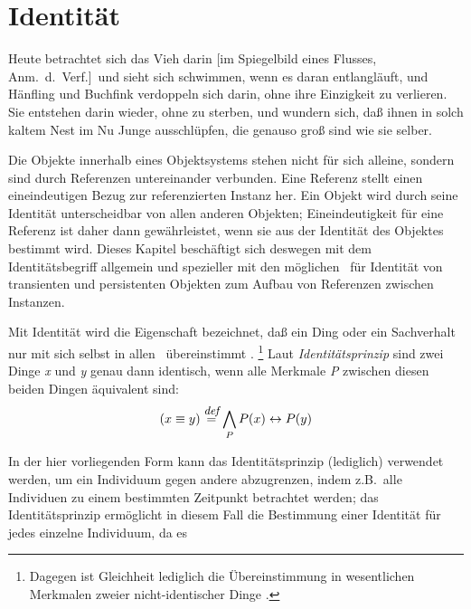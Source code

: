 %
\chapter{Identit\"{a}t}%
\label{chap:idty}%
%
\begin{fortune}
Heute betrachtet sich das Vieh darin [im Spiegelbild eines Flusses,
Anm.\ d.\ Verf.]\ und sieht sich schwimmen, wenn es daran
entlangl\"{a}uft, und H\"{a}nfling und Buchfink verdoppeln sich darin, ohne
ihre Einzigkeit zu verlieren. Sie entstehen darin wieder, ohne zu
sterben, und wundern sich, da\ss{} ihnen in solch kaltem Nest im Nu Junge
ausschl\"{u}pfen, die genauso gro\ss{} sind wie sie selber.
\end{fortune}
%
Die Objekte innerhalb eines Objektsystems stehen nicht f\"{u}r sich
alleine, sondern sind durch Referenzen untereinander verbunden. Eine 
Referenz stellt einen eineindeutigen Bezug zur referenzierten Instanz
her. Ein Objekt wird durch seine Identit\"{a}t unterscheidbar von allen
anderen Objekten; Eineindeutigkeit f\"{u}r eine Referenz ist daher dann
gew\"{a}hrleistet, wenn sie aus der Identit\"{a}t des Objektes bestimmt
wird. Dieses Kapitel besch\"{a}ftigt sich deswegen mit dem
Identit\"{a}tsbegriff allgemein und spezieller mit den m\"{o}glichen
\representationforms\ f\"{u}r Identit\"{a}t von transienten und
persistenten Objekten zum Aufbau von Referenzen zwischen Instanzen.
%
\par{}Mit Identit\"{a}t wird die Eigenschaft bezeichnet, da\ss{} ein Ding
oder ein Sachverhalt nur mit sich selbst in allen
\ \"{u}bereinstimmt
\cite[]{bib:kl76} \cite[]{bib:zd90}.%
\footnote{Dagegen ist Gleichheit lediglich die \"{U}bereinstimmung in
wesentlichen Merkmalen zweier nicht-identischer Dinge
\cite[]{bib:schm82}.} Laut {\em Identit\"{a}tsprinzip\/}
sind zwei Dinge {\it x\/} und {\it y\/} genau dann identisch, wenn
alle Merkmale {\it P\/} zwischen diesen beiden Dingen \"{a}quivalent
sind:
%
\begin{equation}
(x \equiv y) %
\stackrel{\mbox{\rm\footnotesize\it def}}{=}
\bigwedge_{P} P(x) \leftrightarrow P(y)
\end{equation}
%
\par{}In der hier vorliegenden Form kann das Identit\"{a}tsprinzip
(lediglich) verwendet werden, um ein Individuum gegen andere
abzugrenzen, indem z.B.\ alle Individuen zu einem bestimmten Zeitpunkt
betrachtet werden; das Identit\"{a}tsprinzip erm\"{o}glicht in diesem Fall
die Bestimmung einer Identit\"{a}t f\"{u}r jedes einzelne Individuum, da es
